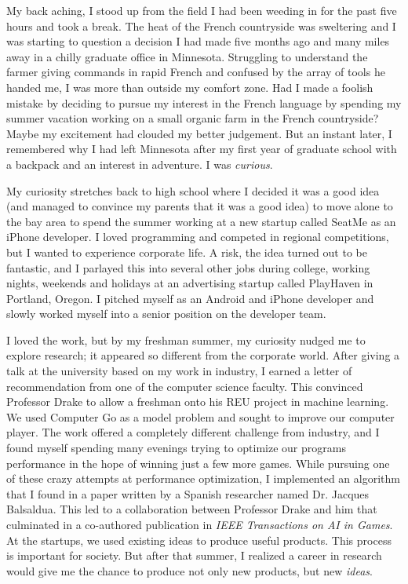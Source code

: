 \documentclass[12pt]{article}
\title{}
\begin{document}
My back aching, I stood up from the field I had been weeding in for the past five hours and took a break. The heat of the French countryside was sweltering and I was starting to question a  decision I had made five months ago and many miles away in a chilly graduate office in Minnesota. Struggling to understand the farmer giving commands in rapid French and confused by the array of tools he handed me, I was more than outside my comfort zone. Had I made a foolish mistake by deciding to pursue my interest in the French language by spending my summer vacation working on a small organic farm in the French countryside? Maybe my excitement had clouded my better judgement. But an instant later, I remembered why I had left Minnesota after my first year of graduate school with a backpack and an interest in adventure. I was \textit{curious}.  

My curiosity stretches back to high school where I decided it was a good idea (and managed to convince my parents that it was a good idea) to move alone to the bay area to spend the summer working at a new startup called SeatMe as an iPhone developer. I loved programming and competed in regional competitions, but I wanted to experience corporate life. A risk, the idea turned out to be fantastic, and I parlayed this into several other jobs during college, working nights, weekends and holidays at an advertising startup called PlayHaven in Portland, Oregon. I pitched myself as an Android and iPhone developer and slowly worked myself into a senior position on the developer team. 

I loved the work, but by my freshman summer, my curiosity nudged me to explore research; it appeared so different from the corporate world. After giving a talk at the university based on my work in industry, I earned a letter of recommendation from one of the computer science faculty. This convinced Professor Drake to allow a freshman onto his REU project in machine learning. We used Computer Go as a model problem and sought to improve our computer player. The work offered a completely different challenge from industry, and I found myself spending many evenings trying to optimize our programs performance in the hope of winning just a few more games. While pursuing one of these crazy attempts at performance optimization, I implemented an algorithm that I found in a paper written by a Spanish researcher named Dr. Jacques Balsaldua. This led to a collaboration between Professor Drake and him that culminated in a co-authored publication in \textit{IEEE Transactions on AI in Games}. At the startups, we used existing ideas to produce useful products. This process is important for society. But after that summer, I realized a career in research would give me the chance to produce not only new products, but new \textit{ideas}. 
\end{document}
